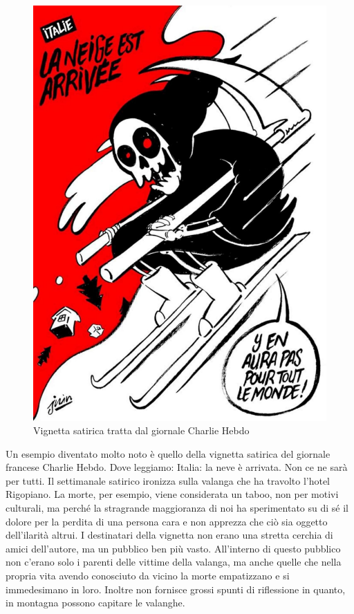 \documentclass[12pt]{book} %
\begin{document}
\begin{mdframed}[linewidth=1pt]
\needspace{4cm}
\begin{figure}
  \centering
  \includegraphics[width=0.95\linewidth]{images/Libro-img032.jpg}
  \begin{minipage}{\linewidth}
    \caption{Vignetta satirica tratta dal giornale Charlie Hebdo}
  \end{minipage}
\end{figure}

Un esempio diventato molto noto è quello della vignetta satirica del giornale francese Charlie Hebdo. Dove
leggiamo: {\textquotedbl}Italia: la neve è arrivata. Non ce ne sarà per tutti{\textquotedbl}. Il settimanale satirico
ironizza sulla valanga che ha travolto l'hotel Rigopiano. La morte, per esempio, viene considerata un taboo,
non per motivi culturali, ma perché la stragrande maggioranza di noi ha sperimentato su di sé il dolore per la perdita
di una persona cara e non apprezza che ciò sia oggetto dell'ilarità altrui. I destinatari della
vignetta non erano una stretta cerchia di amici dell'autore, ma un pubblico ben più vasto.
All'interno di questo pubblico non c'erano solo i parenti delle vittime della
valanga, ma anche quelle che nella propria vita avendo conosciuto da vicino la morte empatizzano e si immedesimano in
loro. Inoltre non fornisce grossi spunti di riflessione in quanto, in montagna possono capitare le valanghe.


\end{mdframed}
\end{document}
